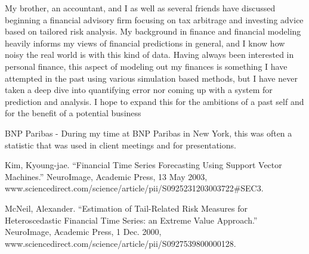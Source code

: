 \documentclass[11pt,a4paper]{article}
\begin{document}
My brother, an accountant, and I as well as several friends have discussed beginning a financial advisory firm focusing on tax arbitrage and investing advice based on tailored risk analysis. My background in finance and financial modeling heavily informs my views of financial predictions in general, and I know how noisy the real world is with this kind of data. Having always been interested in personal finance, this aspect of modeling out my finances is something I have attempted in the past using various simulation based methods, but I have never taken a deep dive into quantifying error nor coming up with a system for prediction and analysis. I hope to expand this for the ambitions of a past self and for the benefit of a potential business


%
%



\begin{thebibliography}{9}
	
	BNP Paribas - During my time at BNP Paribas in New York, this was often a statistic that was used in client meetings and for presentations. 
	
	Kim, Kyoung-jae. “Financial Time Series Forecasting Using Support Vector Machines.” NeuroImage, Academic Press, 13 May 2003, www.sciencedirect.com/science/article/pii/S0925231203003722\#SEC3.
	
	McNeil, Alexander. “Estimation of Tail-Related Risk Measures for Heteroscedastic Financial Time Series: an Extreme Value Approach.” NeuroImage, Academic Press, 1 Dec. 2000, www.sciencedirect.com/science/article/pii/S0927539800000128.
	
\end{thebibliography}


%
\end{document}
